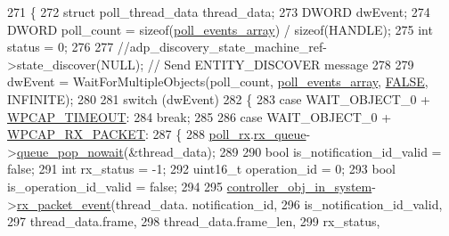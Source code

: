 \begin{DoxyCode}
271 \{
272     \textcolor{keyword}{struct }poll\_thread\_data thread\_data;
273     DWORD dwEvent;
274     DWORD poll\_count = \textcolor{keyword}{sizeof}(\hyperlink{classavdecc__lib_1_1system__layer2__multithreaded__callback_aab31adfcffa52ef5c5f3b599588804c0}{poll\_events\_array}) / \textcolor{keyword}{sizeof}(HANDLE);
275     \textcolor{keywordtype}{int} status = 0;
276 
277     \textcolor{comment}{//adp\_discovery\_state\_machine\_ref->state\_discover(NULL); // Send ENTITY\_DISCOVER message}
278 
279     dwEvent = WaitForMultipleObjects(poll\_count, \hyperlink{classavdecc__lib_1_1system__layer2__multithreaded__callback_aab31adfcffa52ef5c5f3b599588804c0}{poll\_events\_array}, 
      \hyperlink{maap__log_8h_aa93f0eb578d23995850d61f7d61c55c1}{FALSE}, INFINITE);
280 
281     \textcolor{keywordflow}{switch} (dwEvent)
282     \{
283     \textcolor{keywordflow}{case} WAIT\_OBJECT\_0 + \hyperlink{classavdecc__lib_1_1system__layer2__multithreaded__callback_a8d9ed11bf786804c7d0c1b70c7d295a6a3153df525da2a276d05b55df1a14aaba}{WPCAP\_TIMEOUT}:
284         \textcolor{keywordflow}{break};
285 
286     \textcolor{keywordflow}{case} WAIT\_OBJECT\_0 + \hyperlink{classavdecc__lib_1_1system__layer2__multithreaded__callback_a8d9ed11bf786804c7d0c1b70c7d295a6a4093ff861a2be33a5de1e32c9be7715f}{WPCAP\_RX\_PACKET}:
287     \{
288         \hyperlink{classavdecc__lib_1_1system__layer2__multithreaded__callback_a9d1d17e86300584a39c000430f578ee2}{poll\_rx}.\hyperlink{structavdecc__lib_1_1system__layer2__multithreaded__callback_1_1msg__poll_a93c2870712cbf709f0eca144e08787bc}{rx\_queue}->\hyperlink{classavdecc__lib_1_1system__message__queue_ae21ddf8c4896fce42973b06c5910b721}{queue\_pop\_nowait}(&thread\_data);
289 
290         \textcolor{keywordtype}{bool} is\_notification\_id\_valid = \textcolor{keyword}{false};
291         \textcolor{keywordtype}{int} rx\_status = -1;
292         uint16\_t operation\_id = 0;
293         \textcolor{keywordtype}{bool} is\_operation\_id\_valid = \textcolor{keyword}{false};
294 
295         \hyperlink{namespaceavdecc__lib_aa57af65842215e8122158a5fd2e31718}{controller\_obj\_in\_system}->\hyperlink{classavdecc__lib_1_1controller__imp_abc210704762ea3b2cba8422543d3ce44}{rx\_packet\_event}(thread\_data.
      notification\_id,
296                                                   is\_notification\_id\_valid,
297                                                   thread\_data.frame,
298                                                   thread\_data.frame\_len,
299                                                   rx\_status,

\end{DoxyCode}
